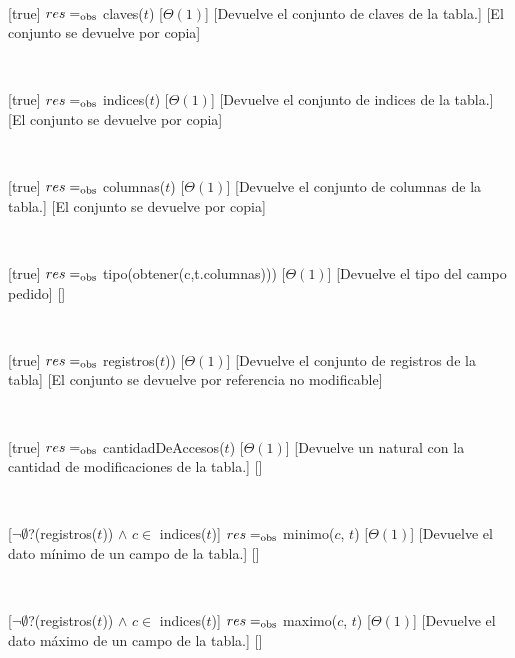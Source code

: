 \begin{Interfaz}
~

[true]
{$res =_{\mathrm{obs}}$ claves($t$)}
[$\Theta(1)$]
[Devuelve el conjunto de claves de la tabla.]
[El conjunto se devuelve por copia]

~

[true]
{$res =_{\mathrm{obs}}$ indices($t$)}
[$\Theta(1)$]
[Devuelve el conjunto de indices de la tabla.]
[El conjunto se devuelve por copia]

~

[true]
{$res =_{\mathrm{obs}}$ columnas($t$)}
[$\Theta(1)$]
[Devuelve el conjunto de columnas de la tabla.]
[El conjunto se devuelve por copia]

~

[true]
{$res =_{\mathrm{obs}}$ tipo(obtener(c,t.columnas)))}
[$\Theta(1)$]
[Devuelve el tipo del campo pedido]
[]

~

[true]
{$res =_{\mathrm{obs}}$ registros($t$))}
[$\Theta(1)$]
[Devuelve el conjunto de registros de la tabla]
[El conjunto se devuelve por referencia no modificable]

~

[true]
{$res =_{\mathrm{obs}}$ cantidadDeAccesos($t$)}
[$\Theta(1)$]
[Devuelve un natural con la cantidad de modificaciones de la tabla.]
[]



~

[$\neg \emptyset$?(registros($t$)) $\land$ $c \in$ indices($t$)]
{$res =_{\mathrm{obs}}$ minimo($c$, $t$)}
[$\Theta(1)$]
[Devuelve el dato mínimo de un campo de la tabla.]
[]

~

[$\neg \emptyset$?(registros($t$)) $\land$ $c \in$ indices($t$)]
{$res =_{\mathrm{obs}}$ maximo($c$, $t$)}
[$\Theta(1)$]
[Devuelve el dato máximo de un campo de la tabla.]
[]

~


\end{Interfaz}
